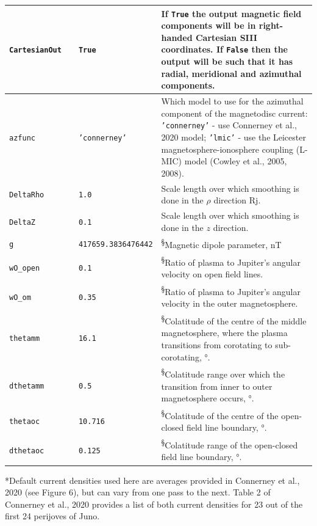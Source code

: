 \begin{table}[h]
\begin{tabular}{|l|l|l|l|}
	\texttt{CartesianOut} &  & \texttt{True} & If \texttt{True} the output magnetic field components will be in right-handed Cartesian SIII coordinates. If \texttt{False} then the output will be such that it has radial, meridional and azimuthal components. \\ \hline
	\texttt{azfunc} &  & \texttt{'connerney'} & Which model to use for the azimuthal component of the magnetodisc current: \texttt{'connerney'} - use Connerney et al., 2020 model; \texttt{'lmic'} - use the Leicester magnetosphere-ionosphere coupling (L-MIC) model (Cowley et al., 2005, 2008). \\ \hline
	\texttt{DeltaRho} &  & \texttt{1.0} & Scale length over which smoothing is done in the $\rho$ direction Rj. \\ \hline
	\texttt{DeltaZ} &  & \texttt{0.1} & Scale length over which smoothing is done in the $z$ direction. \\ \hline
	\texttt{g} &  & \texttt{417659.3836476442} & \textsuperscript{§}Magnetic dipole parameter, nT \\ \hline
	\texttt{wO\_open} &  & \texttt{0.1} & \textsuperscript{§}Ratio of plasma to Jupiter's angular velocity on open field lines. \\ \hline
	\texttt{wO\_om} &  & \texttt{0.35} & \textsuperscript{§}Ratio of plasma to Jupiter's angular velocity in the outer magnetosphere. \\ \hline
	\texttt{thetamm} &  & \texttt{16.1} & \textsuperscript{§}Colatitude of the centre of the middle magnetosphere, where the plasma transitions from corotating to sub-corotating, °. \\ \hline
	\texttt{dthetamm} & & \texttt{0.5} & \textsuperscript{§}Colatitude range over which the transition from inner to outer magnetosphere occurs, °. \\ \hline
	\texttt{thetaoc} &  & \texttt{10.716} & \textsuperscript{§}Colatitude of the centre of the open-closed field line boundary, °. \\ \hline
	\texttt{dthetaoc} & & \texttt{0.125} & \textsuperscript{§}Colatitude range of the open-closed field line boundary, °. \\ \hline
	\end{tabular}
	\end{table}
	
	*Default current densities used here are averages provided in Connerney et al., 2020 (see Figure 6), but can vary from one pass to the next. Table 2 of Connerney et al., 2020 provides a list of both current densities for 23 out of the first 24 perijoves of Juno.
	
